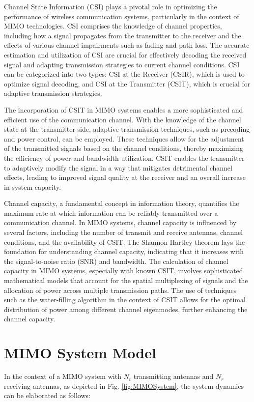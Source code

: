 \documentclass[lettersize,journal]{IEEEtran}
\begin{document}
Channel State Information (CSI) plays a pivotal role in optimizing the performance of wireless communication systems, particularly in the context of MIMO technologies\cite{shen2016compressed}. CSI comprises the knowledge of channel properties, including how a signal propagates from the transmitter to the receiver and the effects of various channel impairments such as fading and path loss. The accurate estimation and utilization of CSI are crucial for effectively decoding the received signal and adapting transmission strategies to current channel conditions. CSI can be categorized into two types: CSI at the Receiver (CSIR), which is used to optimize signal decoding, and CSI at the Transmitter (CSIT), which is crucial for adaptive transmission strategies.

The incorporation of CSIT in MIMO systems enables a more sophisticated and efficient use of the communication channel. With the knowledge of the channel state at the transmitter side, adaptive transmission techniques, such as precoding and power control, can be employed. These techniques allow for the adjustment of the transmitted signals based on the channel conditions, thereby maximizing the efficiency of power and bandwidth utilization. CSIT enables the transmitter to adaptively modify the signal in a way that mitigates detrimental channel effects, leading to improved signal quality at the receiver and an overall increase in system capacity.

Channel capacity, a fundamental concept in information theory, quantifies the maximum rate at which information can be reliably transmitted over a communication channel. In MIMO systems, channel capacity is influenced by several factors, including the number of transmit and receive antennas, channel conditions, and the availability of CSIT\cite{goldsmith2003capacity}. The Shannon-Hartley theorem lays the foundation for understanding channel capacity, indicating that it increases with the signal-to-noise ratio (SNR) and bandwidth\cite{rioul2014shannon}. The calculation of channel capacity in MIMO systems, especially with known CSIT, involves sophisticated mathematical models that account for the spatial multiplexing of signals and the allocation of power across multiple transmission paths. The use of techniques such as the water-filling algorithm in the context of CSIT allows for the optimal distribution of power among different channel eigenmodes, further enhancing the channel capacity\cite{lu2013water}.

\section{MIMO System Model}
In the context of a MIMO system with \( N_t \) transmitting antennas and \( N_r \) receiving antennas, as depicted in Fig. \ref{fig:MIMOSystem}, the system dynamics can be elaborated as follows:
\end{document}
